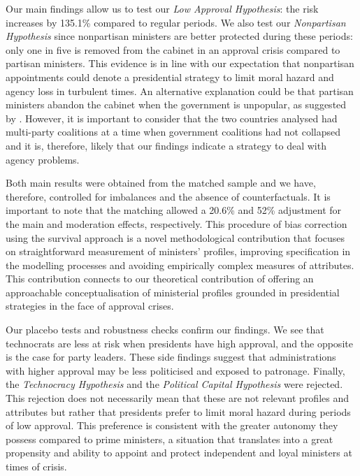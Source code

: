 \documentclass[12pt,halfline,a4paper]{ouparticle}
\begin{document}
Our main findings allow us to test our {\itshape Low Approval Hypothesis}: the risk increases by 135.1\% compared to regular periods. We also test our {\itshape Nonpartisan Hypothesis} since nonpartisan ministers are better protected during these periods: only one in five is removed from the cabinet in an approval crisis compared to partisan ministers. This evidence is in line with our expectation that nonpartisan appointments could denote a presidential strategy to limit moral hazard and agency loss in turbulent times. An alternative explanation could be that partisan ministers abandon the cabinet when the government is unpopular, as suggested by \cite{Camerlo2015b}. However, it is important to consider that the two countries analysed had multi-party coalitions at a time when government coalitions had not collapsed and it is, therefore, likely that our findings indicate a strategy to deal with agency problems.

Both main results were obtained from the matched sample and we have, therefore, controlled for imbalances and the absence of counterfactuals. It is important to note that the matching allowed a 20.6\% and 52\% adjustment for the main and moderation effects, respectively. This procedure of bias correction using the survival approach is a novel methodological contribution that focuses on straightforward measurement of ministers’ profiles, improving specification in the modelling processes and avoiding empirically complex measures of attributes. This contribution connects to our theoretical contribution of offering an approachable conceptualisation of ministerial profiles grounded in presidential strategies in the face of approval crises.

Our placebo tests and robustness checks confirm our findings. We see that technocrats are less at risk when presidents have high approval, and the opposite is the case for party leaders. These side findings suggest that administrations with higher approval may be less politicised and exposed to patronage. Finally, the {\itshape Technocracy Hypothesis} and the {\itshape Political Capital Hypothesis} were rejected. This rejection does not necessarily mean that these are not relevant profiles and attributes but rather that presidents prefer to limit moral hazard during periods of low approval. This preference is consistent with the greater autonomy they possess compared to prime ministers, a situation that translates into a great propensity and ability to appoint and protect independent and loyal ministers at times of crisis.
\end{document}

